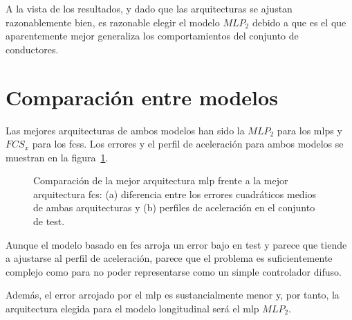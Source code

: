 A la vista de los resultados, y dado que las arquitecturas se ajustan razonablemente bien, es razonable elegir el modelo $MLP_2$ debido a que es el que aparentemente mejor generaliza los comportamientos del conjunto de conductores.

\section{Comparación entre modelos}

Las mejores arquitecturas de ambos modelos han sido la $MLP_2$ para los \acp{mlp} y $FCS_x$ para los \acp{fcs}. Los errores y el perfil de aceleración para ambos modelos se muestran en la figura~\ref{fig:comparison-between-best-mlp-and-fcs-architecture}.

\begin{figure}
	\centering
	\qquad
	\caption[Comparación entre los dos tipos de modelo longitudinal]{Comparación de la mejor arquitectura \ac{mlp} frente a la mejor arquitectura \ac{fcs}: (a) diferencia entre los errores cuadráticos medios de ambas arquitecturas y (b) perfiles de aceleración en el conjunto de test.}
	\label{fig:comparison-between-best-mlp-and-fcs-architecture}
\end{figure}

Aunque el modelo basado en \ac{fcs} arroja un error bajo en test y parece que tiende a ajustarse al perfil de aceleración, parece que el problema es suficientemente complejo como para no poder representarse como un simple controlador difuso.

Además, el error arrojado por el \ac{mlp} es sustancialmente menor y, por tanto, la arquitectura elegida para el modelo longitudinal será el \ac{mlp} $MLP_2$.